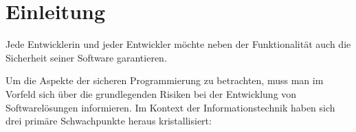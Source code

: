 \section{Einleitung}\label{einleitung}





%
%

Jede Entwicklerin und jeder Entwickler möchte neben der Funktionalität 
auch die Sicherheit seiner Software garantieren.

Um die Aspekte der sicheren Programmierung zu betrachten, 
muss man im Vorfeld sich über die grundlegenden Risiken bei der 
Entwicklung von Softwarelösungen informieren.
Im Kontext der Informationstechnik haben sich drei primäre Schwachpunkte
heraus kristallisiert:

